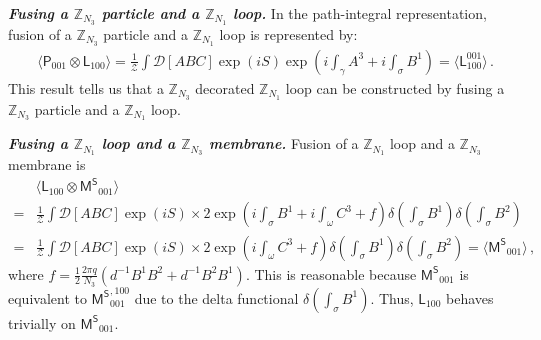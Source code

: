 \documentclass[11pt,nofootinbib,preprint]{revtex4-1}
\begin{document}
\textbf{\textit{Fusing a $\mathbb{Z} _{N_3}$ particle and a $\mathbb{Z} _{N_1}$ loop.}}
In the path-integral representation, fusion of a $\mathbb{Z} _{N_3}$ particle and a $\mathbb{Z} _{N_1}$ loop is represented by:
\begin{align}
&	\langle\mathsf{P}_{001}\otimes \mathsf{L}_{100} \rangle  =\frac{1}{\mathcal{Z}}\int{\mathcal{D} \left[ ABC \right] \exp \left( iS \right) \exp \left( i\int_{\gamma}{A^3}+i\int_{\sigma}{B^1} \right)} =\langle \mathsf{L}_{100}^{001} \rangle\,.
\end{align}
This result tells us that a $\mathbb{Z} _{N_3}$ decorated $\mathbb{Z} _{N_1}$ loop can be constructed by fusing a $\mathbb{Z} _{N_3}$ particle and a $\mathbb{Z} _{N_1}$ loop.


\textbf{\textit{Fusing  a $\mathbb{Z} _{N_1}$ loop and a $\mathbb{Z} _{N_3}$ membrane.}}
Fusion of a $\mathbb{Z} _{N_1}$ loop and a $\mathbb{Z} _{N_3}$ membrane is
\begin{align}
&	\langle \mathsf{L}_{100}\otimes \mathsf{M^S}_{001} \rangle \nonumber\\
	=&\frac{1}{\mathcal{Z}}\int\!\! \mathcal{D} \!\left[ ABC \right]\! \exp \left( iS \right) \times2\exp \left( i\int_{\sigma}{B^1}+i\int_{\omega}{C^3+f} \right)\delta \left( \int_{\sigma}{B^1} \right) \delta \left( \int_{\sigma}{B^2} \right) \nonumber
	\\
	=&\frac{1}{\mathcal{Z}}\int\!\! \mathcal{D} \!\left[ ABC \right]\!   \exp \left( iS \right) \times 2\exp \left( i\int_{\omega}{C^3+f} \right)\delta \left( \int_{\sigma}{B^1} \right) \delta \left( \int_{\sigma}{B^2} \right) =\langle \mathsf{M^S}_{001} \rangle \,,
\end{align}
where $f=\frac{1}{2}\frac{2\pi q}{N_3}\left( d^{-1}B^1B^2+d^{-1}B^2B^1 \right) $.
This is reasonable because $\mathsf{M^S}_{001}$ is equivalent to $\mathsf{M^S}_{001}^{,100}$ due to the delta functional $\delta \left( \int_{\sigma}{B^1} \right) $. Thus, $\mathsf{L}_{100}$ behaves trivially on $\mathsf{M^S}_{001}$.
\end{document}
